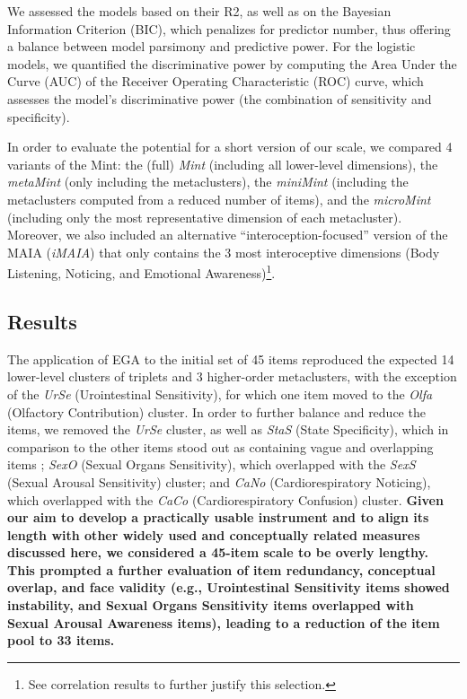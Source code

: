 \documentclass[
  man,
  floatsintext,
  longtable,
  nolmodern,
  notxfonts,
  notimes,
  mask,
  colorlinks=true,linkcolor=blue,citecolor=blue,urlcolor=blue]{apa7}
\begin{document}
We assessed the models based on their R2, as well as on the Bayesian
Information Criterion (BIC), which penalizes for predictor number, thus
offering a balance between model parsimony and predictive power. For the
logistic models, we quantified the discriminative power by computing the
Area Under the Curve (AUC) of the Receiver Operating Characteristic
(ROC) curve, which assesses the model's discriminative power (the
combination of sensitivity and specificity).

In order to evaluate the potential for a short version of our scale, we
compared 4 variants of the Mint: the (full) \emph{Mint} (including all
lower-level dimensions), the \emph{metaMint} (only including the
metaclusters), the \emph{miniMint} (including the metaclusters computed
from a reduced number of items), and the \emph{microMint} (including
only the most representative dimension of each metacluster). Moreover,
we also included an alternative ``interoception-focused'' version of the
MAIA (\emph{iMAIA}) that only contains the 3 most interoceptive
dimensions (Body Listening, Noticing, and Emotional
Awareness)\footnote{See correlation results to further justify this
  selection.}.

\subsection{Results}\label{results-1}

The application of EGA to the initial set of 45 items reproduced the
expected 14 lower-level clusters of triplets and 3 higher-order
metaclusters, with the exception of the \emph{UrSe} (Urointestinal
Sensitivity), for which one item moved to the \emph{Olfa} (Olfactory
Contribution) cluster. In order to further balance and reduce the items,
we removed the \emph{UrSe} cluster, as well as \emph{StaS} (State
Specificity), which in comparison to the other items stood out as
containing vague and overlapping items ; \emph{SexO} (Sexual Organs
Sensitivity), which overlapped with the \emph{SexS} (Sexual Arousal
Sensitivity) cluster; and \emph{CaNo} (Cardiorespiratory Noticing),
which overlapped with the \emph{CaCo} (Cardiorespiratory Confusion)
cluster. \textbf{Given our aim to develop a practically usable
instrument and to align its length with other widely used and
conceptually related measures discussed here, we considered a 45-item
scale to be overly lengthy. This prompted a further evaluation of item
redundancy, conceptual overlap, and face validity (e.g., Urointestinal
Sensitivity items showed instability, and Sexual Organs Sensitivity
items overlapped with Sexual Arousal Awareness items), leading to a
reduction of the item pool to 33 items.}
\end{document}
